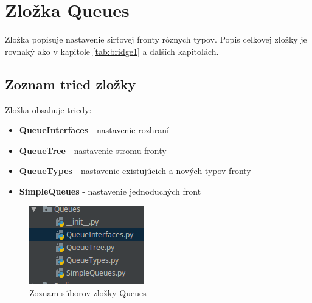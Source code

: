 \section{Zložka Queues}
Zložka popisuje nastavenie sirťovej fronty rôznych typov. Popis celkovej zložky je rovnaký ako v kapitole \ref{tab:bridge1} a ďalších kapitolách.
\subsection{Zoznam tried zložky}
Zložka obsahuje triedy:
\begin{itemize}
\item \textbf{QueueInterfaces} - nastavenie rozhraní
\item \textbf{QueueTree} - nastavenie stromu fronty
\item \textbf{QueueTypes} - nastavenie existujúcich a nových typov fronty
\item \textbf{SimpleQueues} - nastavenie jednoduchých front
\end{itemize}
\begin{figure}[H]
\centering
\includegraphics[scale=0.6]{../text/queueList.png}
\caption{Zoznam súborov zložky Queues}
\label{fig:queuelist}
\end{figure}
